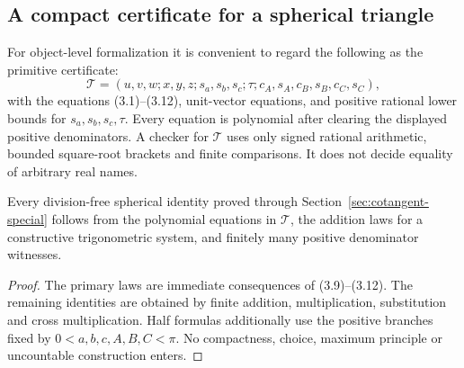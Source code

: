 \subsection{A compact certificate for a spherical triangle}

For object-level formalization it is convenient to regard the following as the
primitive certificate:
\begin{equation}
 \mathcal T=(u,v,w;x,y,z;s_a,s_b,s_c;\tau;
             c_A,s_A,c_B,s_B,c_C,s_C),                     \tag{3.13}
\end{equation}
with the equations (3.1)--(3.12), unit-vector equations, and positive rational
lower bounds for \(s_a,s_b,s_c,\tau\).  Every equation is polynomial after
clearing the displayed positive denominators.  A checker for \(\mathcal T\)
uses only signed rational arithmetic, bounded square-root brackets and finite
comparisons.  It does not decide equality of arbitrary real names.

\begin{proposition}
Every division-free spherical identity proved through
Section~\ref{sec:cotangent-special} follows from the polynomial equations in
\(\mathcal T\), the addition laws for a constructive trigonometric system, and
finitely many positive denominator witnesses.
\end{proposition}

\begin{proof}
The primary laws are immediate consequences of (3.9)--(3.12).  The remaining
identities are obtained by finite addition, multiplication, substitution and
cross multiplication.  Half formulas additionally use the positive branches
fixed by \(0<a,b,c,A,B,C<\pi\).  No compactness, choice, maximum principle or
uncountable construction enters.
\end{proof}
